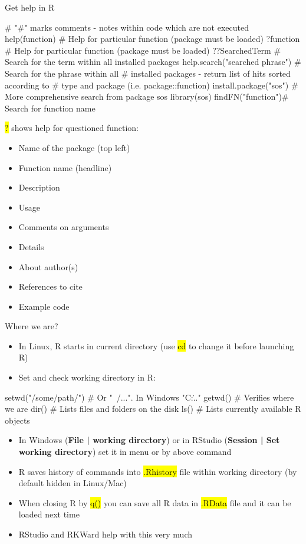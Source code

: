 \documentclass[compress, ucs, xelatex, 11pt, xcolor=svgnames,
  hyperref={
    bookmarks=true,
    unicode=true,
    colorlinks=true,
    pdftitle={Molecular data in R},
    plainpages=false,
    pdfauthor={Vojtech Zeisek},
    pdfsubject={Course about phylogeny and evolution in R},
    pdfcreator={XeLaTeX},
    pdfkeywords={R, evolution, phylogeny, molecular data},
    linkcolor=Tomato,
    anchorcolor=SaddleBrown,
    citecolor=Goldenrod,
    filecolor=DarkMagenta,
    menucolor=Sienna,
    urlcolor=DarkTurquoise,
    pdftex},
  url={hyphens, lowtilde} %
  ]{beamer}
\renewcommand{\texttt}[1]{\hl{\ttfamily #1}}
\begin{document}
\begin{frame}[fragile]{Get help in R}
  \begin{spluscode}
    # "#" marks comments - notes within code which are not executed
    help(function) # Help for particular function (package must be loaded)
    ?function # Help for particular function (package must be loaded)
    ??SearchedTerm # Search for the term within all installed packages
    help.search("searched phrase") # Search for the phrase within all
      # installed packages - return list of hits sorted according to
      # type and package (i.e. package::function)
    install.package("sos") # More comprehensive search from package sos
    library(sos)
    findFN("function")# Search for function name
  \end{spluscode}
\alert{\texttt{?}} shows help for questioned function:
\begin{multicols}{2}
  \begin{itemize}
    \item Name of the package (top left)
    \item Function name (headline)
    \item Description
    \item Usage
    \item Comments on arguments
    \item Details
    \item About author(s)
    \item References to cite
    \item Example code
  \end{itemize}
\end{multicols}
\end{frame}

\begin{frame}[fragile]{Where we are?}
\begin{itemize}
 \item In Linux, R starts in current directory (use \texttt{cd} to change it before launching R)
 \item Set and check working directory in R:
\end{itemize}
  \begin{spluscode}
    setwd("/some/path/") # Or "~/...". In Windows "C:\..."
    getwd() # Verifies where we are
    dir() # Lists files and folders on the disk
    ls() # Lists currently available R objects
  \end{spluscode}
\begin{itemize}
 \item In Windows (\textbf{File | working directory}) or in RStudio (\textbf{Session | Set working directory}) set it in menu or by above command
 \item R saves history of commands into \texttt{.Rhistory} file within working directory (by default hidden in Linux/Mac)
 \item When closing R by \texttt{q()} you can save all R data in \texttt{.RData} file and it can be loaded next time
 \item RStudio and RKWard help with this very much
\end{itemize}
\end{frame}
\end{document}
